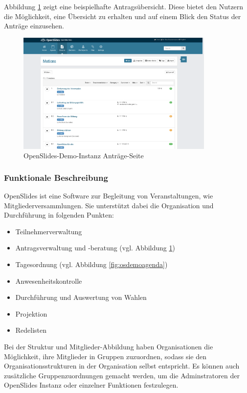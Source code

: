 \documentclass[11pt,a4paper]{article}
\begin{document}
Abbildung \ref{fig:osdemomotion} zeigt eine beispielhafte Antragsübersicht. 
Diese bietet den Nutzern die Möglichkeit, eine Übersicht zu erhalten und auf 
einem Blick den Status der Anträge einzusehen.
\begin{figure}[htp]
	\centering
	\includegraphics[width=0.87\textwidth]{img/openslides_motions_page.png}
	\caption[OpenSlides-Demo-Instanz \glqq{}Anträge\grqq{}-Seite
	\cite{osdemo}]{OpenSlides-Demo-Instanz \glqq{}Anträge\grqq{}-Seite 
		\cite{osdemo}}
	\label{fig:osdemomotion}
\end{figure}
\newpage
\subsubsection{Funktionale Beschreibung}
\label{subsubsec:introfofb}
OpenSlides \cite{oshp} ist eine Software zur Begleitung von Veranstaltungen, 
wie Mitgliederversammlungen. Sie unterstützt dabei die Organisation und 
Durchführung in folgenden Punkten:
\begin{itemize}
	\item Teilnehmerverwaltung
	\item Antragsverwaltung und -beratung (vgl. Abbildung 
		\ref{fig:osdemomotion})
	\item Tagesordnung (vgl. Abbildung \ref{fig:osdemoagenda})
	\item Anwesenheitskontrolle
	\item Durchführung und Auswertung von Wahlen
	\item Projektion
	\item Redelisten
\end{itemize}
Bei der Struktur und Mitglieder-Abbildung haben Organisationen die Möglichkeit, 
ihre Mitglieder in Gruppen zuzuordnen, sodass sie den Organisationsstrukturen 
in der Organisation selbst entspricht. Es können auch zusätzliche 
Gruppenzuordnungen gemacht werden, um die Adminstratoren der OpenSlides Instanz 
oder einzelner Funktionen festzulegen.
\end{document}
